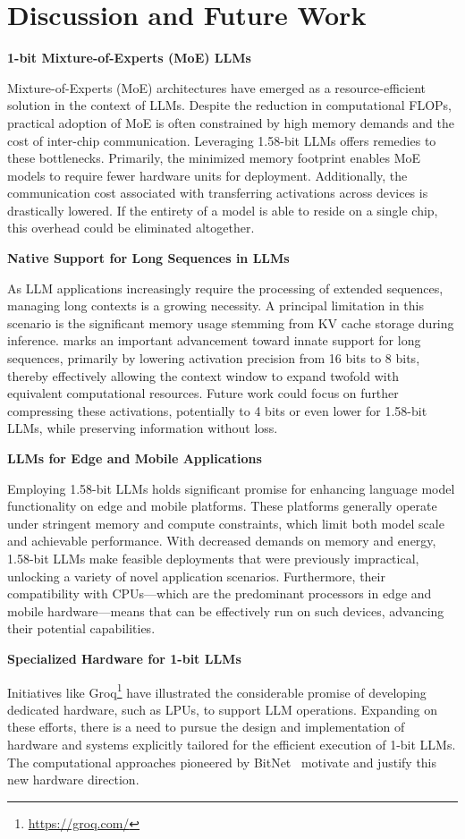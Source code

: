 \section{Discussion and Future Work}

\textbf{1-bit Mixture-of-Experts (MoE) LLMs}

Mixture-of-Experts (MoE) architectures have emerged as a resource-efficient solution in the context of LLMs. Despite the reduction in computational FLOPs, practical adoption of MoE is often constrained by high memory demands and the cost of inter-chip communication. Leveraging 1.58-bit LLMs offers remedies to these bottlenecks. Primarily, the minimized memory footprint enables MoE models to require fewer hardware units for deployment. Additionally, the communication cost associated with transferring activations across devices is drastically lowered. If the entirety of a model is able to reside on a single chip, this overhead could be eliminated altogether.

\textbf{Native Support for Long Sequences in LLMs}

As LLM applications increasingly require the processing of extended sequences, managing long contexts is a growing necessity. A principal limitation in this scenario is the significant memory usage stemming from KV cache storage during inference.  marks an important advancement toward innate support for long sequences, primarily by lowering activation precision from 16 bits to 8 bits, thereby effectively allowing the context window to expand twofold with equivalent computational resources. Future work could focus on further compressing these activations, potentially to 4 bits or even lower for 1.58-bit LLMs, while preserving information without loss.

\textbf{LLMs for Edge and Mobile Applications}

Employing 1.58-bit LLMs holds significant promise for enhancing language model functionality on edge and mobile platforms. These platforms generally operate under stringent memory and compute constraints, which limit both model scale and achievable performance. With decreased demands on memory and energy, 1.58-bit LLMs make feasible deployments that were previously impractical, unlocking a variety of novel application scenarios. Furthermore, their compatibility with CPUs—which are the predominant processors in edge and mobile hardware—means that  can be effectively run on such devices, advancing their potential capabilities.

\textbf{Specialized Hardware for 1-bit LLMs}

Initiatives like Groq\footnote{\url{https://groq.com/}} have illustrated the considerable promise of developing dedicated hardware, such as LPUs, to support LLM operations. Expanding on these efforts, there is a need to pursue the design and implementation of hardware and systems explicitly tailored for the efficient execution of 1-bit LLMs. The computational approaches pioneered by BitNet~\cite{bitnet} motivate and justify this new hardware direction.